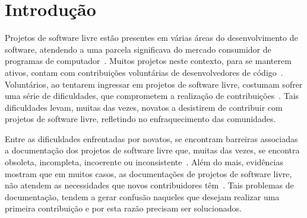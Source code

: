 
\chapter{Introdução}
\label{cap:introduction}

Projetos de software livre estão presentes em várias áreas do desenvolvimento de software, atendendo a uma parcela significava do mercado consumidor de programas de computador~\citep{bonaccorsi2003open}. Muitos projetos neste contexto, para se manterem ativos, contam com contribuições voluntárias de desenvolvedores de código~\citep{crowston2012free}. Voluntários, ao tentarem ingressar em projetos de software livre, costumam sofrer uma série de dificuldades, que comprometem a realização de contribuições~\citep{steinmacher2014thehard}. Tais dificuldades levam, muitas das vezes, novatos a desistirem de contribuir com projetos de software livre, refletindo no enfraquecimento das comunidades. 

Entre as dificuldades enfrentadas por novatos, se encontram barreiras associadas a documentação dos projetos de software livre que, muitas das vezes, se encontra obsoleta, incompleta, incoerente ou inconsistente~\citep{briand2003enough, aghajani2019issues}. Além do mais, evidências mostram que em muitos casos, as documentações de projetos de software livre, não atendem as necessidades que novos contribuidores têm~\citep{steinmacher2014thehard}. Tais problemas de documentação, tendem a gerar confusão naqueles que desejam realizar uma primeira contribuição e por esta razão precisam ser solucionados. 

